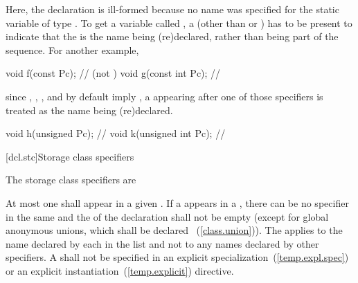 Here, the declaration   is ill-formed because no
name was specified for the static variable of type . To get a
variable called , a  (other than
 or ) has to be present to indicate that
the   is the name being (re)declared,
rather than being part of the  sequence. For
another example,

\begin{codeblock}
void f(const Pc);               //  (not )
void g(const int Pc);           // 
\end{codeblock}
\exitexampleb

\pnum
{}%
%
%
%
\enternote
since , , , and 
by default imply , a  appearing after one
of those specifiers is treated as the name being (re)declared.
\enterexample

\begin{codeblock}
void h(unsigned Pc);            // 
void k(unsigned int Pc);        // 
\end{codeblock}
\exitexampleb
\exitnoteb

[dcl.stc]{Storage class specifiers}%
%
%
%
%
%
%

\pnum
The storage class specifiers are

\begin{bnf}
\br
    \br
    \br
    \br
    \br
\end{bnf}

At most one  shall appear in a given
. If a 
appears in a , there can be no
 specifier in the same  and
the  of the declaration shall not be
empty (except for global anonymous unions, which shall be declared
%
~(\ref{class.union})). The
 applies to the name declared by each
 in the list and not to any names declared by
other specifiers. A  shall not be
specified in an explicit specialization~(\ref{temp.expl.spec}) or an
explicit instantiation~(\ref{temp.explicit}) directive.

